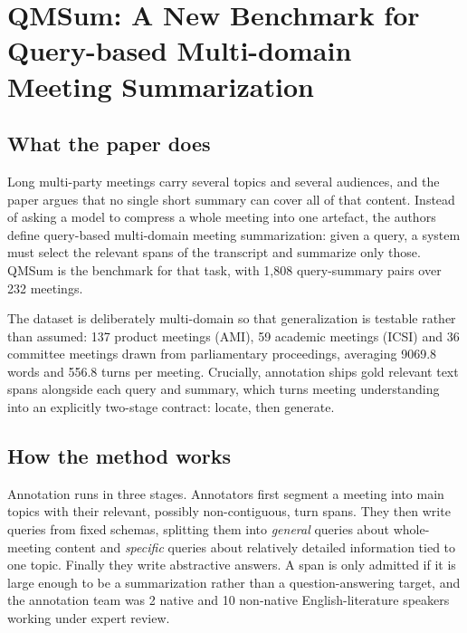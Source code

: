 \section{QMSum: A New Benchmark for Query-based Multi-domain Meeting Summarization}

\subsection{What the paper does}

Long multi-party meetings carry several topics and several audiences, and the paper argues that no single short summary can cover all of that content. Instead of asking a model to compress a whole meeting into one artefact, the authors define query-based multi-domain meeting summarization: given a query, a system must select the relevant spans of the transcript and summarize only those. QMSum is the benchmark for that task, with 1,808 query-summary pairs over 232 meetings.

The dataset is deliberately multi-domain so that generalization is testable rather than assumed: 137 product meetings (AMI), 59 academic meetings (ICSI) and 36 committee meetings drawn from parliamentary proceedings, averaging 9069.8 words and 556.8 turns per meeting. Crucially, annotation ships gold relevant text spans alongside each query and summary, which turns meeting understanding into an explicitly two-stage contract: locate, then generate.

\subsection{How the method works}

Annotation runs in three stages. Annotators first segment a meeting into main topics with their relevant, possibly non-contiguous, turn spans. They then write queries from fixed schemas, splitting them into \emph{general} queries about whole-meeting content and \emph{specific} queries about relatively detailed information tied to one topic. Finally they write abstractive answers. A span is only admitted if it is large enough to be a summarization rather than a question-answering target, and the annotation team was 2 native and 10 non-native English-literature speakers working under expert review.

